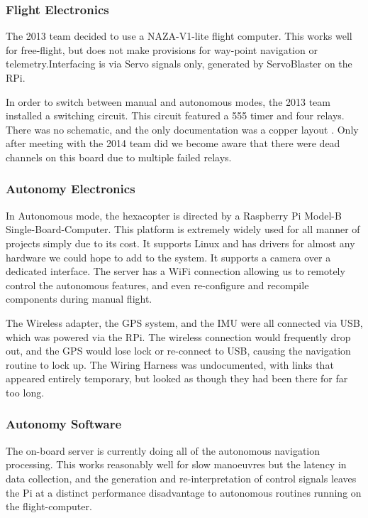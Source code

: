 \documentclass[a4paper, 11pt, titlepage]{article}
\begin{document}
    \subsubsection{Flight Electronics}
      The 2013 team  decided to use a NAZA-V1-lite flight computer.  This works well for free-flight, but does not make provisions for way-point navigation or telemetry.Interfacing is via Servo signals only, generated by ServoBlaster \cite{ServoBlaster} on the RPi.

      In order to switch between manual and autonomous modes, the 2013 team installed a switching circuit. This circuit featured a 555 timer and four relays.
      There was no schematic, and the only documentation was a copper layout \cite[p. 27-28]{OConnor}.  Only after meeting with the 2014 team did we become aware that there were dead channels on this board due to multiple failed relays.

    \subsubsection{Autonomy Electronics}
      In Autonomous mode, the hexacopter is directed by a Raspberry Pi Model-B Single-Board-Computer.
      This platform is extremely widely used for all manner of projects simply due to its cost.
      It supports Linux and has drivers for almost any hardware we could hope to add to the system. It supports a camera over a dedicated interface.
      The server has a WiFi connection allowing us to remotely control the autonomous features, and even re-configure and recompile components during manual flight.

      The Wireless adapter, the GPS system, and the IMU were all connected via USB, which was powered via the RPi.  The wireless connection would frequently drop out, and the GPS would lose lock or re-connect to USB, causing the navigation routine to lock up.
      The Wiring Harness was undocumented, with links that appeared entirely temporary, but looked as though they had been there for far too long.

    \subsubsection{Autonomy Software}
      The on-board server is currently doing all of the autonomous navigation processing.  This works reasonably well for slow manoeuvres but the latency in data collection, and the generation and re-interpretation of control signals leaves the Pi at a distinct performance disadvantage to autonomous routines running on the flight-computer.
\end{document}
